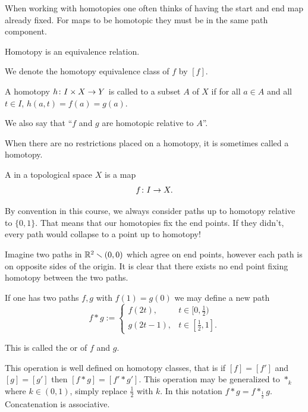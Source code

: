 \documentclass[11pt,leqno,oneside]{amsart}
\numberwithin{thm}{section}
\renewcommand{\setminus}{\smallsetminus}
\newcommand{\x}{\times}
\begin{document}
When working with homotopies one often thinks of having the start and
end map already fixed. For maps to be homotopic they must be in the
same path component.

\begin{prop}
  Homotopy is an equivalence relation.
\end{prop}

We denote the homotopy equivalence class of \(f\) by \([f]\).

\begin{defn}
  A homotopy $h\from I \x X \to Y$ is called  to a subset $A$ of $X$ if for all $a \in A$ and all $t \in I$, $h(a, t) = f(a) = g(a)$.

  We also say that ``$f$ and $g$ are homotopic relative to $A$''.
\end{defn}

When there are no restrictions placed on a homotopy, it is sometimes called a  homotopy.

\begin{defn}
  A  in a topological space $X$ is a map
  \[f \colon I \to X.\]
\end{defn}

By convention in this course, we always consider paths up to homotopy relative to $\{0, 1\}$.  That means that our homotopies fix the end points.  If they didn't, every path would collapse to a point up to homotopy!

Imagine two paths in \(\R^2 \setminus (0,0)\) which agree on end points,
however each path is on opposite sides of the origin. It is clear that
there exists no end point fixing homotopy between the two paths.

\begin{defn}
  If one has two paths \(f,g\) with \(f(1)=g(0)\) we may define a new
  path
  \[f * g :=
    \begin{cases}
      f(2t), & t \in [0,\tfrac{1}{2})\\
      g(2t - 1), & t \in [\tfrac{1}{2},1].
    \end{cases}
  \]

  This is called the  or 
  of $f$ and $g$.

  This operation is well defined on homotopy classes, that is if
  \([f]=[f']\) and \([g]=[g']\) then \([f * g] = [f' * g']\). This
  operation may be generalized to \(*_{k}\) where \(k \in (0,1)\),
  simply replace \(\tfrac{1}{2}\) with \(k\). In this notation
  \(f * g = f *_{\frac{1}{2}} g\). Concatenation is associative.
\end{defn}
\end{document}
